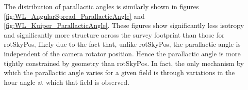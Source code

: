 The distribution of parallactic angles is similarly shown in figures
\autoref{fig:WL_AngularSpread_ParallacticAngle} and
\autoref{fig:WL_Kuiper_ParallacticAngle}.  These figures show significantly less
isotropy and significantly more structure across the survey footprint than those
for rotSkyPos, likely due to the fact that, unlike rotSkyPos, the parallactic
angle is independent of the camera rotator position.  Hence the parallactic
angle is more tightly constrained by geometry than rotSkyPos.  In fact, the only
mechanism by which the parallactic angle varies for a given field is through
variations in the hour angle at which that field is observed.






\newcommand\plottwo[2]{{%
\typeout{Plottwo included the files #1 #2}
\centering
\leavevmode
\texttt{[image: \#1]}%
\hfil
\texttt{[image: \#2]}%
}}%



